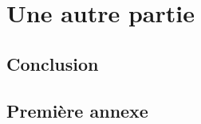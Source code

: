 \documentclass[a4paper,12pt,twoside]{book}
\begin{document}
	\part{Une autre partie}
	
	
	
	\chapter*{Conclusion}
	
	\appendix
	\chapter{Première annexe}
	
	\backmatter
	
	
	
	
	
	\tableofcontents
	
\end{document}
